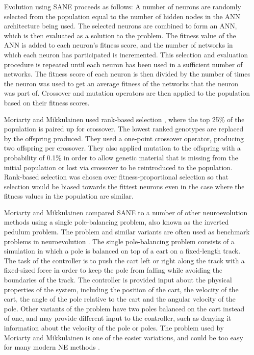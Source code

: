 \documentclass[12pt]{article} %
\begin{document}
Evolution using SANE proceeds as follows: A number of neurons are randomly selected from the population equal to the number of hidden nodes in the ANN architecture being used. The selected neurons are combined to form an ANN, which is then evaluated as a solution to the problem. The fitness value of the ANN is added to each neuron's fitness score, and the number of networks in which each neuron has participated is incremented. This selection and evaluation procedure is repeated until each neuron has been used in a sufficient number of networks. The fitness score of each neuron is then divided by the number of times the neuron was used to get an average fitness of the networks that the neuron was part of. Crossover and mutation operators are then applied to the population based on their fitness scores.

Moriarty and Mikkulainen \cite{Moriarty1996} used rank-based selection \cite{Goldberg1991}, where the top 25\% of the population is paired up for crossover. The lowest ranked genotypes are replaced by the offspring produced. They used a one-point crossover operator, producing two offspring per crossover. They also applied mutation to the offspring with a probability of 0.1\% in order to allow genetic material that is missing from the initial population or lost via crossover to be reintroduced to the population. Rank-based selection was chosen over fitness-proportional selection \cite{Goldberg1991} so that selection would be biased towards the fittest neurons even in the case where the fitness values in the population are similar.

Moriarty and Mikkulainen \cite{Moriarty1996} compared SANE to a number of other neuroevolution methods using a single pole-balancing problem, also known as the inverted pedulum problem. The problem and similar variants are often used as benchmark problems in neuroevolution \cite{Gomez1997}\cite{Igel2003}\cite{Stanley2002}. The single pole-balancing problem consists of a simulation in which a pole is balanced on top of a cart on a fixed-length track. The task of the controller is to push the cart left or right along the track with a fixed-sized force in order to keep the pole from falling while avoiding the boundaries of the track. The controller is provided input about the physical properties of the system, including the position of the cart, the velocity of the cart, the angle of the pole relative to the cart and the angular velocity of the pole. Other variants of the problem have two poles balanced on the cart instead of one, and may provide different input to the controller, such as denying it information about the velocity of the pole or poles. The problem used by Moriarty and Mikkulainen is one of the easier variations, and could be too easy for many modern NE methods \cite{Stanley2002}.
\end{document}
